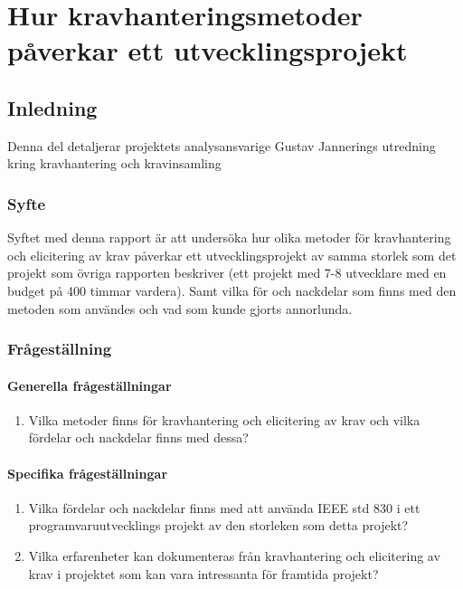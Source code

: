 \chapter{Hur kravhanteringsmetoder påverkar ett utvecklingsprojekt}
\label{cha:indiv-report-jannering}

\section{Inledning}
\label{sec:introduction-jannering}

Denna del detaljerar projektets analysansvarige Gustav Jannerings utredning kring kravhantering och kravinsamling

\subsection{Syfte}
\label{sec:purpose-jannering}


Syftet med denna rapport är att undersöka hur olika metoder för kravhantering och elicitering av krav påverkar ett utvecklingsprojekt av samma storlek som det projekt som övriga rapporten beskriver (ett projekt med 7-8 utvecklare med en budget på 400 timmar vardera). Samt vilka för och nackdelar som finns med den metoden som användes och vad som kunde gjorts annorlunda.

\subsection{Frågeställning}
\label{sec:issue-jannering}

\subsubsection{Generella frågeställningar}
\begin{enumerate}
	\item Vilka metoder finns för kravhantering och elicitering av krav och vilka fördelar och nackdelar finns med dessa? 
\end{enumerate}
\subsubsection{Specifika frågeställningar}
\begin{enumerate}
	\item Vilka fördelar och nackdelar finns med att använda IEEE std 830 i ett programvaruutvecklings projekt av den storleken som detta projekt?
	
	\item Vilka erfarenheter kan dokumenteras från kravhantering och elicitering av krav i projektet som kan vara intressanta
	för framtida projekt?
	
\end{enumerate}
